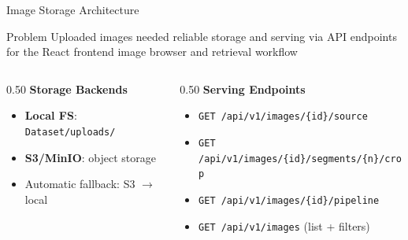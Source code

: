 \documentclass[aspectratio=169,11pt]{beamer}
\begin{document}
\begin{frame}{Image Storage Architecture}
  \begin{block}{Problem}
    Uploaded images needed reliable storage and serving via API endpoints
    for the React frontend image browser and retrieval workflow
  \end{block}

  \begin{columns}[T]
    \begin{column}{0.50\textwidth}
      \textbf{Storage Backends}
      \begin{itemize}
        \item \textbf{Local FS}: \texttt{Dataset/uploads/}
        \item \textbf{S3/MinIO}: object storage
        \item Automatic fallback: S3 $\to$ local
      \end{itemize}
    \end{column}
    \begin{column}{0.50\textwidth}
      \textbf{Serving Endpoints}
      \begin{itemize}
        \item \texttt{GET /api/v1/images/\{id\}/source}
        \item \texttt{GET /api/v1/images/\{id\}/segments/\{n\}/crop}
        \item \texttt{GET /api/v1/images/\{id\}/pipeline}
        \item \texttt{GET /api/v1/images} (list + filters)
      \end{itemize}
    \end{column}
  \end{columns}
\end{frame}
\end{document}
